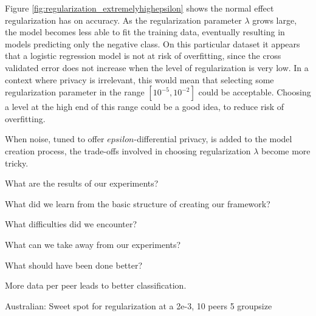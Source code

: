 Figure \ref{fig:regularization_extremelyhighepsilon} shows the normal effect regularization has on accuracy. As the regularization parameter $\lambda$ grows large, the model becomes less able to fit the training data, eventually resulting in models predicting only the negative class. On this particular dataset it appears that a logistic regression model is not at risk of overfitting, since the cross validated error does not increase when the level of regularization is very low. In a context where privacy is irrelevant, this would mean that selecting some regularization parameter in the range $[10^{-5},10^{-2}]$ could be acceptable. Choosing a level at the high end of this range could be a good idea, to reduce risk of overfitting.

When noise, tuned to offer $epsilon$-differential privacy, is added to the model creation process, the trade-offs involved in choosing regularization $\lambda$ become more tricky.

What are the results of our experiments?

What did we learn from the basic structure of creating our framework?

What difficulties did we encounter?

What can we take away from our experiments?

What should have been done better? 

More data per peer leads to better classification.

Australian: Sweet spot for regularization at a 2e-3, 10 peers 5 groupsize


\cleardoublepage